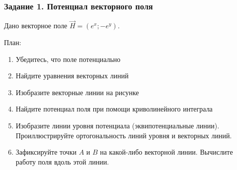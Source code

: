 \begin{frame}\frametitle{Задание 1. Потенциал векторного поля}
	Дано векторное поле \( \vec H = \left( e^x; -e^y \right) \).

	План:
	\begin{enumerate}
		\item Убедитесь, что поле потенциально
		\item Найдите уравнения векторных линий
		\item Изобразите векторные линии на рисунке
		\item Найдите потенциал поля при помощи криволинейного интеграла
		\item Изобразите линии уровня потенциала (эквипотенциальные линии).
		      Проиллюстрируйте ортогональность линий уровня и векторных линий.
		\item Зафиксируйте точки \( A \) и \( B \) на какой-либо векторной линии.
		      Вычислите работу поля вдоль этой линии.
	\end{enumerate}
\end{frame}








